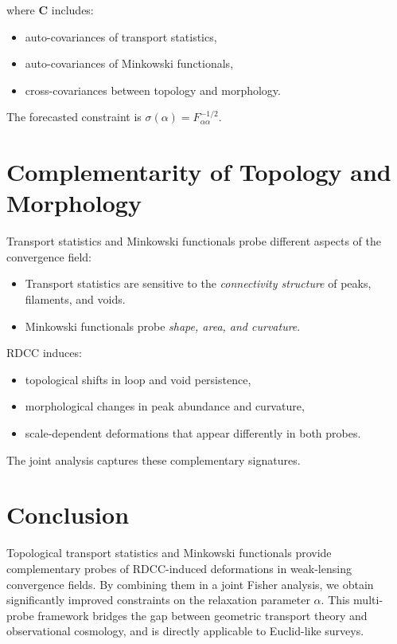 \documentclass[11pt,a4paper]{article}
\begin{document}
where $\mathbf{C}$ includes:

\begin{itemize}
    \item auto-covariances of transport statistics,
    \item auto-covariances of Minkowski functionals,
    \item cross-covariances between topology and morphology.
\end{itemize}

The forecasted constraint is $\sigma(\alpha) = F_{\alpha\alpha}^{-1/2}$.
\section{Complementarity of Topology and Morphology}

Transport statistics and Minkowski functionals probe different aspects of the 
convergence field:

\begin{itemize}
    \item Transport statistics are sensitive to the \emph{connectivity structure} 
          of peaks, filaments, and voids.
    \item Minkowski functionals probe \emph{shape, area, and curvature}.
\end{itemize}

RDCC induces:

\begin{itemize}
    \item topological shifts in loop and void persistence,
    \item morphological changes in peak abundance and curvature,
    \item scale-dependent deformations that appear differently in both probes.
\end{itemize}

The joint analysis captures these complementary signatures.
\section{Conclusion}

Topological transport statistics and Minkowski functionals provide complementary 
probes of RDCC-induced deformations in weak-lensing convergence fields. By 
combining them in a joint Fisher analysis, we obtain significantly improved 
constraints on the relaxation parameter $\alpha$. This multi-probe framework 
bridges the gap between geometric transport theory and observational cosmology, 
and is directly applicable to Euclid-like surveys.


\nocite{*}

\end{document}
